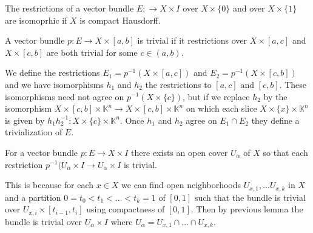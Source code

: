 \documentclass[../Thesis.tex]{subfiles}
\begin{document}
\begin{prop}
The restrictions of a vector bundle $E : \rightarrow X \times I$ over $X \times \{ 0\}$ and over $X \times \{ 1\}$ are isomoprhic if $X$ is compact Hausdorff.
\end{prop}

\begin{lemma}
A vector bundle $p :E \rightarrow X \times[a,b]$ is trivial if it restrictions over $ X \times [a,c]$ and $ X \times [c,b]$ are both trivial for some $c \in (a,b)$. 
\end{lemma}

\begin{myproof}
We define the restrictions $E_1 = p^{-1}(X \times [a,c])$ and $E_2 = p^{-1}(X \times [c,b])$ and we have isomorphisms $h_1$ and $h_2$ the restrictions to $[a,c]$ and $[c,b]$. These isomorphisms need not agree on $p^{-1}( X \times \{ c\})$, but if we replace $h_2$ by the isomorphism $X \times [c,b] \times \mathbb{K}^n \rightarrow X \times [c,b] \times \mathbb{K}^n$ on which each slice $X \times \{x\} \times \mathbb{K}^n$ is given by  $h_1h_2^{-1} : X \times \{ c \} \times \mathbb{K}^n$. Once $h_1$ and $h_2$ agree on $E_1 \cap E_2$ they define a trivialization of $E$.
\end{myproof}

\begin{lemma}
For a vector bundle $p : E \rightarrow X \times I$ there exists an open cover $U_\alpha$ of $X$ so that each restriction $p^{-1}(U_\alpha \times I \rightarrow U_\alpha \times I$ is trivial. 
\end{lemma}

\begin{myproof}
This is because for each $x \in X$ we can find open neighborhoods $U_{x,1}, ... U_{x,k}$ in $X$ and a partition $0 = t_0 < t_1 < ... < t_k = 1$ of $[0,1]$ such that the bundle is trivial over $U_{x,i} \times [t_{i-1},t_i]$ using compactness of $[0,1]$. Then by previous lemma the bundle is trivial over $U_\alpha \times I$ where $U_\alpha = U_{x,1} \cap ... \cap U_{x,k}$.
\end{myproof}
\end{document}
